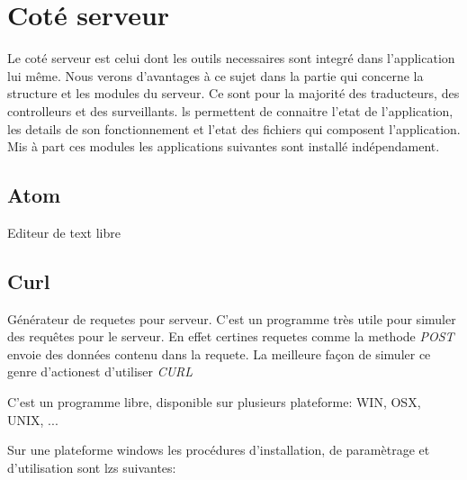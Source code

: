 \section{Coté serveur}
Le coté serveur est celui dont les outils necessaires sont integré dans l'application lui même. Nous verons d'avantages à ce sujet dans la partie qui concerne la structure et les modules du serveur. Ce sont pour la majorité des traducteurs, des controlleurs et des surveillants. ls permettent de connaitre l'etat de l'application, les details de son fonctionnement et l'etat des fichiers qui composent l'application.
Mis à part ces modules les applications suivantes sont installé indépendament.
\subsection{Atom}
Editeur de text libre
\subsection{Curl}
Générateur de requetes pour serveur. C'est un programme très utile pour simuler des requêtes pour le serveur. En effet certines requetes comme la methode \textit{POST} envoie des données contenu dans la requete. La meilleure façon de simuler ce genre d'actionest d'utiliser \textit{CURL}

C'est un programme libre, disponible sur plusieurs plateforme: WIN, OSX, UNIX, ...

Sur une plateforme windows les procédures d'installation, de paramètrage et d'utilisation sont lzs suivantes: